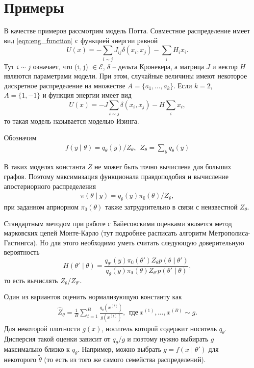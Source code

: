 \documentclass[12pt]{article}
\begin{document}
\section{Примеры}

В качестве примеров рассмотрим модель Потта. Совместное распределение имеет вид \eqref{eqn:eng_function} с  функцией энергии равной
\begin{equation}
U(x) = -\sum\limits_{i\sim j} J_{ij}\delta(x_i, x_j) - \sum\limits_i H_i x_i.
\end{equation}
Тут $i \sim j$ означает, что (i, j) $\in \mathcal{E}$, $\delta$ -- дельта Кронекера, а матрица $J$ и вектор $H$ являются параметрами модели.
При этом, случайные величины имеют некоторое дискретное распределение на множестве $A = \{a_1, \ldots, a_k\}$. Если $k = 2$, $A = \{ 1, -1\}$  и  функция энергии имеет вид
\begin{equation}
U(x) = -J\sum\limits_{i\sim j} \delta(x_i, x_j) - H\sum\limits_i  x_i,
\end{equation}
то такая модель называется моделью Изинга.

Обозначим 
\begin{gather*}
f(y \mid \theta) = q_{\theta}(y)/Z_{\theta}, \ \ Z_{\theta} = \sum\limits_{y} q_{\theta}(y) 
\end{gather*}

В таких моделях константа $Z$ не может быть точно вычислена для больших графов. Поэтому  максимизация функционала правдоподобия и вычисление апостериорного распределения
\begin{gather*}
\pi(\theta \mid y) = q_\theta(y)\pi_0(\theta)/Z_{\theta},
\end{gather*}
при заданном априорном $\pi_0(\theta)$ также затруднительно в связи с неизвестной $Z_\theta$.

Стандартным методом при работе с Байесовскими оценками является метод марковских цепей Монте-Карло (тут подробнее расписать алгоритм Метрополиса-Гастингса).
Но для этого необходимо уметь считать следующую доверительную вероятность
\begin{equation}
H(\theta'\mid \theta) = \frac{q_{\theta'}(y) \pi_0(\theta')Z_{\theta} p(\theta\mid\theta')}{q_{\theta}(y) \pi_0(\theta)Z_{\theta'} p(\theta'\mid\theta)},
\end{equation}
то есть вычислять $Z_{\theta}/Z_{\theta'}$.



Один из вариантов оценить нормализующую константу как
\begin{gather*}
\widehat{Z}_{\theta} = \frac{1}{B} \sum\limits_{t=1}^B \frac{q_\theta(x^{(t)})}{g(x^{(t)})}, \ \  \text{где} \ x^{(1)}, \ldots, x^{(B)} \sim g.
\end{gather*}
Для некоторой плотности $g(x)$, носитель которой содержит носитель $q_{\theta}$. Дисперсия такой оценки зависит от $q_\theta/g$ и поэтому нужно выбирать $g$ максимально близко к $q_\theta$. Например, можно выбрать $g = f(x \mid \theta')$ для некоторого $\tilde{\theta}$ (то есть из того же самого семейства распределений).
\end{document}
